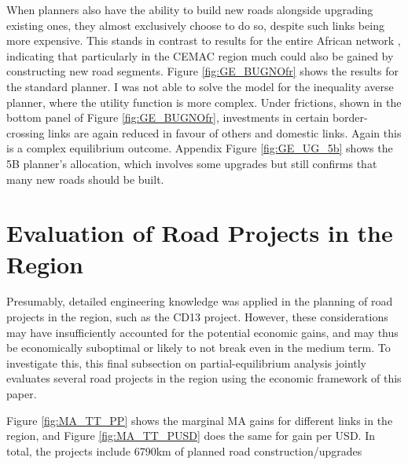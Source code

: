 \documentclass[a4paper]{article}
\begin{document}
When planners also have the ability to build new roads alongside upgrading existing ones, they almost exclusively choose to do so, despite such links being more expensive. This stands in contrast to results for the entire African network \citep{krantz2024optimal}, indicating that particularly in the CEMAC region much could also be gained by constructing new road segments. Figure \ref{fig:GE_BUGNOfr} shows the results for the standard planner. I was not able to solve the model for the inequality averse planner, where the utility function is more complex. Under frictions, shown in the bottom panel of Figure \ref{fig:GE_BUGNOfr}, investments in certain border-crossing links are again reduced in favour of others and domestic links. Again this is a complex equilibrium outcome. Appendix Figure \ref{fig:GE_UG_5b} shows the 5B planner's allocation, which involves some upgrades but still confirms that many new roads should be built. 





\section{Evaluation of Road Projects in the Region}

Presumably, detailed engineering knowledge was applied in the planning of road projects in the region, such as the CD13 project. However, these considerations may have insufficiently accounted for the potential economic gains, and may thus be economically suboptimal or likely to not break even in the medium term. To investigate this, this final subsection on partial-equilibrium analysis jointly evaluates several road projects in the region using the economic framework of this paper.   \newline 

Figure \ref{fig:MA_TT_PP} shows the marginal MA gains for different links in the region, and Figure \ref{fig:MA_TT_PUSD} does the same for gain per USD. In total, the projects include 6790km of planned road construction/upgrades 
\end{document}
